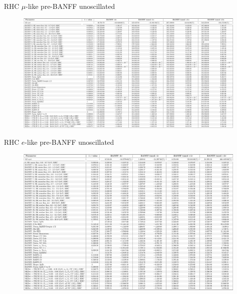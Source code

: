 \documentclass{beamer}
\begin{document}
\begin{frame}{RHC $\mu$-like pre-BANFF unoscillated}
	\centering
	\begin{figure}
		\includegraphics[page=1, trim={0cm 0cm 0cm 0cm}, clip, scale=0.25] {images/variations/tables/systematic_tables_prefit_unosc_RHC1Rmu}
	\end{figure}
\end{frame}

\begin{frame}{RHC $e$-like pre-BANFF unoscillated}
	\centering
	\begin{figure}
		\includegraphics[page=1, trim={0cm 0cm 0cm 0cm}, clip, scale=0.3] {images/variations/tables/systematic_tables_prefit_unosc_RHC1Re}
	\end{figure}
\end{frame}
\end{document}
